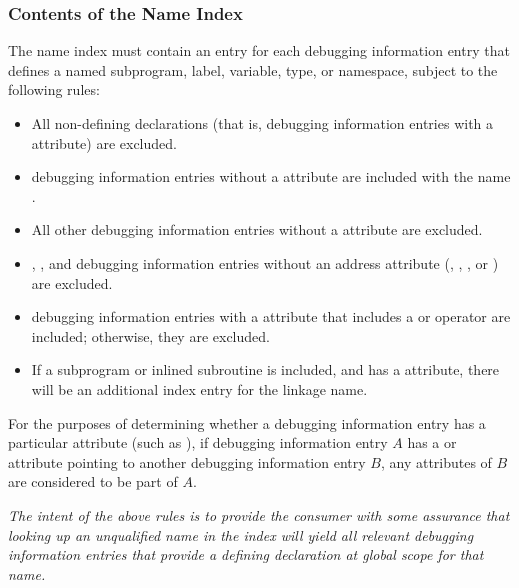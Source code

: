 \subsubsection{Contents of the Name Index}
\label{chap:contentsofthenameindex}
The name index must contain an entry for each 
debugging information entry that defines a
named subprogram, label, variable, type, or namespace, 
subject to the following rules:
\begin{itemize}

\item All non-defining declarations (that is, 
      debugging information entries with a
      \DWATdeclaration{} attribute) are excluded.

\item \DWTAGnamespace{} debugging information entries 
      without a \DWATname{} attribute are
      included with the name 
      .

\item All other debugging information entries 
      without a \DWATname{} attribute are excluded.

\item \DWTAGsubprogram{}, \DWTAGinlinedsubroutine{}, and
      \DWTAGlabel{} debugging information entries 
      without an address attribute (\DWATlowpc{},
      \DWAThighpc{}, \DWATranges{}, or \DWATentrypc{}) 
      are excluded.

\item \DWTAGvariable{} debugging information entries 
      with a \DWATlocation{} attribute that includes a 
      \DWOPaddr{} or \DWOPformtlsaddress{} operator are
      included; otherwise, they are excluded.

\item If a subprogram or inlined subroutine is included, and has a
      \DWATlinkagename{} attribute, there will be an additional
      index entry for the linkage name.
      
\end{itemize}

For the purposes of determining whether a 
debugging information entry has a particular
attribute (such as \DWATname{}), if 
debugging information entry $A$ has a \DWATspecification{}
or \DWATabstractorigin{} attribute pointing to another 
debugging information entry $B$, any
attributes of $B$ are considered to be part of $A$.

\textit{The intent of the above rules is to provide the consumer with
some assurance that looking up an unqualified name in the index
will yield all relevant debugging information entries
that provide a defining declaration
at global scope for that name.}

